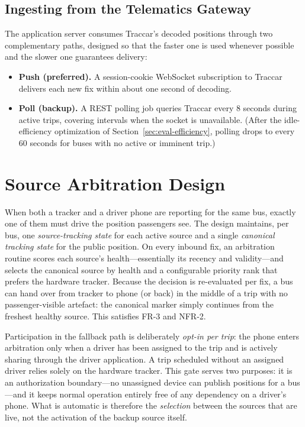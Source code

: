 \subsection{Ingesting from the Telematics Gateway}
The application server consumes Traccar's decoded positions through two
complementary paths, designed so that the faster one is used whenever
possible and the slower one guarantees delivery:

\begin{itemize}
  \item \textbf{Push (preferred).} A session-cookie WebSocket
  subscription to Traccar delivers each new fix within about one second
  of decoding.
  \item \textbf{Poll (backup).} A REST polling job queries Traccar every
  8 seconds during active trips, covering intervals when the socket is
  unavailable. (After the idle-efficiency optimization of
  Section~\ref{sec:eval-efficiency}, polling drops to every 60 seconds
  for buses with no active or imminent trip.)
\end{itemize}

\section{Source Arbitration Design}
\label{sec:design-arbitration}
When both a tracker and a driver phone are reporting for the same bus,
exactly one of them must drive the position passengers see. The design
maintains, per bus, one \emph{source-tracking state} for each active
source and a single \emph{canonical tracking state} for the public
position. On every inbound fix, an arbitration routine scores each
source's health---essentially its recency and validity---and selects the
canonical source by health and a configurable priority rank that prefers
the hardware tracker. Because the decision is re-evaluated per fix, a bus
can hand over from tracker to phone (or back) in the middle of a trip
with no passenger-visible artefact: the canonical marker simply continues
from the freshest healthy source. This satisfies FR-3 and NFR-2.

Participation in the fallback path is deliberately \emph{opt-in per
trip}: the phone enters arbitration only when a driver has been assigned
to the trip and is actively sharing through the driver application. A
trip scheduled without an assigned driver relies solely on the hardware
tracker. This gate serves two purposes: it is an authorization
boundary---no unassigned device can publish positions for a bus---and it
keeps normal operation entirely free of any dependency on a driver's
phone. What is automatic is therefore the \emph{selection} between the
sources that are live, not the activation of the backup source itself.

